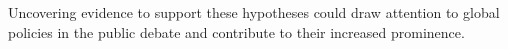 Uncovering evidence to support these hypotheses could %
draw attention to global policies in the public debate and contribute to their increased prominence.